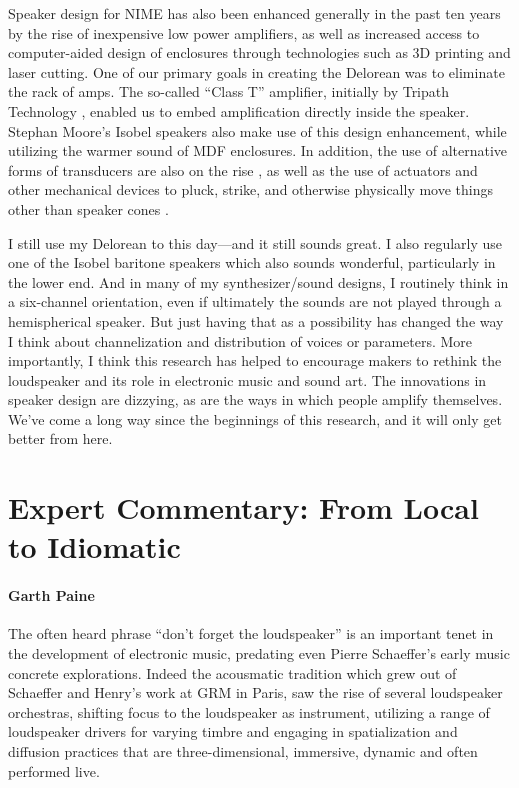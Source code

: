 Speaker design for NIME has also been enhanced generally in the past ten years by the rise of inexpensive low power amplifiers, as well as increased access to computer-aided design of enclosures through technologies such as 3D printing and laser cutting.  One of our primary goals in creating the Delorean was to eliminate the rack of amps. The so-called ``Class T'' amplifier, initially by Tripath Technology \cite{Santo:2009}, enabled us to embed amplification directly inside the speaker.  Stephan Moore's Isobel speakers also make use of this design enhancement, while utilizing the warmer sound of MDF enclosures.  In addition, the use of alternative forms of transducers are also on the rise \cite{Bowers:2014}, as well as the use of actuators and other mechanical devices to pluck, strike, and otherwise physically move things other than speaker cones \cite{Kapur:2011a}.

I still use my Delorean to this day---and it still sounds great. I also regularly use one of the Isobel baritone speakers which also sounds wonderful, particularly in the lower end.  And in many of my synthesizer/sound designs, I routinely think in a six-channel orientation, even if ultimately the sounds are not played through a hemispherical speaker.  But just having that as a possibility has changed the way I think about channelization and distribution of voices or parameters.  More importantly, I think this research has helped to encourage makers to rethink the loudspeaker and its role in electronic music and sound art.  The innovations in speaker design are dizzying, as are the ways in which people amplify themselves.  We've come a long way since the beginnings of this research, and it will only get better from here.


\section*{Expert Commentary: From Local to Idiomatic}

\paragraph{Garth Paine}

The often heard phrase ``don't forget the loudspeaker'' is an important tenet in the development of electronic music, predating even Pierre Schaeffer's early music concrete explorations. Indeed the acousmatic tradition which grew out of Schaeffer and Henry's work at GRM in Paris, saw the rise of several loudspeaker orchestras, shifting focus to the loudspeaker as instrument, utilizing a range of loudspeaker drivers for varying timbre and engaging in spatialization and diffusion practices that are three-dimensional, immersive, dynamic and often performed live.


